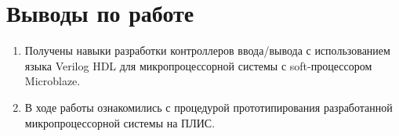 \documentclass[a4paper, 12pt]{article}
\begin{document}
\section{Выводы по работе}
\begin{enumerate}
\item Получены навыки разработки контроллеров ввода/вывода с использованием языка Verilog HDL для микропроцессорной системы с soft-процессором Microblaze.
\item В ходе работы ознакомились с процедурой прототипирования разработанной микропроцессорной системы на ПЛИС.
\end{enumerate}
\end{document}
